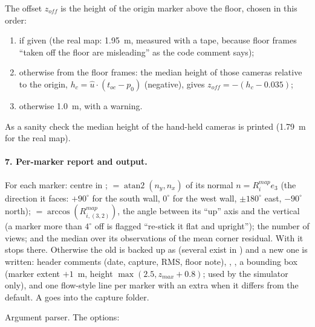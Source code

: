 The offset $z_{off}$ is the height of the origin marker above the floor, chosen in this order:
\begin{enumerate}[nosep]
\item {} if given (the real map: 1.95~m, measured with a tape, because floor frames ``taken off
  the floor are misleading'' as the code comment says);
\item otherwise from the floor frames: the median height of those cameras relative to the origin,
  $h_c = \hat u \cdot (t_{oc} - p_0)$ (negative), gives $z_{off} = -(h_c - 0.035)$;
\item otherwise 1.0~m, with a warning.
\end{enumerate}
As a sanity check the median height of the hand-held cameras is printed (1.79~m for the real map).

\paragraph{7. Per-marker report and output.} For each marker: centre in ;  $=
\operatorname{atan2}(n_y, n_x)$ of its normal $n = R^{map}_i e_3$ (the direction it faces: $+90^\circ$ for the
south wall, $0^\circ$ for the west wall, $\pm180^\circ$ east, $-90^\circ$ north);  $=
\arccos(R^{map}_{i,(3,2)})$, the angle between its ``up'' axis and the vertical (a marker more than $4^\circ$ off
is flagged ``re-stick it flat and upright''); the number of views; and the median over its observations of the mean
corner residual. With  it stops there. Otherwise the old  is backed up as
 (several exist in ) and a new one is written: header comments
(date, capture, RMS, floor note), , , a  bounding box (marker extent
$+1$~m, height $\max(2.5, z_{max}+0.8)$; used by the simulator only), and one flow-style line per marker
 with an extra  when it differs from the default. A
 goes into the capture folder.

Argument parser. The  options:

